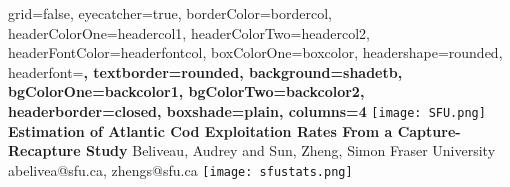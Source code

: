 \documentclass[paperwidth=58in,paperheight=47in,portrait]{baposter}
\begin{document}


\begin{poster}{
	grid=false,
	eyecatcher=true, 
	borderColor=bordercol,
	headerColorOne=headercol1,
	headerColorTwo=headercol2,
	headerFontColor=headerfontcol,
	boxColorOne=boxcolor,
	headershape=rounded,
	headerfont=\Large\sf\bf,
	textborder=rounded,
	background=shadetb,
	bgColorOne=backcolor1,
	bgColorTwo=backcolor2,
	headerborder=closed,
  boxshade=plain,
  columns=4
}
{
			\texttt{[image: SFU.png]}
}
{\sf\bf
	\color{titlecol}Estimation of Atlantic Cod Exploitation Rates From a Capture-Recapture Study
}
{
	\vspace{1em} Beliveau, Audrey and Sun, Zheng, Simon Fraser University\\
	{\smaller abelivea@sfu.ca, zhengs@sfu.ca}
}
{
			\texttt{[image: sfustats.png]}
}


\end{poster}
\end{document}
